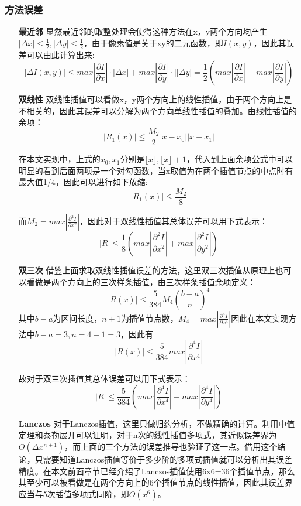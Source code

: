 \documentclass[UTF8]{ctexart}
\begin{document}
\subsubsection{方法误差}
\begin{itemize}
\item [\textbf{最近邻}]
显然最近邻的取整处理会使得这种方法在x，y两个方向均产生$|\Delta x|\leq \frac{1}{2},|\Delta y|\leq \frac{1}{2}$，由于像素值是关于xy的二元函数，即$I(x,y)$，因此其误差可以由此计算出来:
$$|\Delta I(x,y)| \leq max|\frac{\partial I}{\partial x}|\cdot|\Delta x| + max|\frac{\partial I}{\partial y}|\cdot||\Delta y| = \frac{1}{2}(max|\frac{\partial I}{\partial x}|+max|\frac{\partial I}{\partial y}|)$$
\item [\textbf{双线性}]
双线性插值可以看做x，y两个方向上的线性插值，由于两个方向上是不相关的，因此其误差可以分解为两个方向单线性插值的叠加。由线性插值的余项：
$$|R_1(x)|\leq \frac{M_2}{2} |x-x_0||x-x_1|$$

在本文实现中，上式的$x_0,x_1$分别是$\lfloor x \rfloor, \lfloor x \rfloor+ 1$，代入到上面余项公式中可以明显的看到后面两项是一个对勾函数，当x取值为在两个插值节点的中点时有最大值1/4，因此可以进行如下放缩:
$$|R_1(x)|\leq \frac{M_2}{8}$$

而$M_2 = max|\frac{\partial^2I}{\partial x^2}|$，因此对于双线性插值其总体误差可以用下式表示：
\begin{equation}
    |R| \leq \frac{1}{8}(max|\frac{\partial^2 I}{\partial x^2}|+max|\frac{\partial^2 I}{\partial y^2}|)
\end{equation}

\item [\textbf{双三次}]
借鉴上面求取双线性插值误差的方法，这里双三次插值从原理上也可以看做是两个方向上的三次样条插值，由三次样条插值余项定义：
$$|R(x)|\leq \frac{5}{384} M_4(\frac{b-a}{n})^4$$其中$b-a$为区间长度，$n+1$为插值节点数，$M_4=max|\frac{\partial^4 I}{\partial x^4}|$因此在本文实现方法中$b-a=3,n=4-1=3$，因此有$$|R(x)|\leq \frac{5}{384}max|\frac{\partial^4 I}{\partial x^4}|$$

故对于双三次插值其总体误差可以用下式表示：
\begin{equation}
    |R| \leq \frac{5}{384}(max|\frac{\partial^4 I}{\partial x^4}|+max|\frac{\partial^4 I}{\partial y^4}|)
\end{equation}

\item [\textbf{Lanczos}]
对于Lanczos插值，这里只做归约分析，不做精确的计算。利用中值定理和泰勒展开可以证明，对于n次的线性插值多项式，其近似误差界为$O(\Delta x^{n+1})$，而上面的三个方法的误差推导也验证了这一点。借用这个结论，只需要知道Lanczos插值等价于多少阶的多项式插值就可以分析出其误差精度。在本文前面章节已经介绍了Lanczos插值使用6x6=36个插值节点，那么其至少可以被看做是在两个方向上的6个插值节点的线性插值，因此其误差界应当与5次插值多项式同阶，即$O(x^6)$。
\end{itemize}
\end{document}
